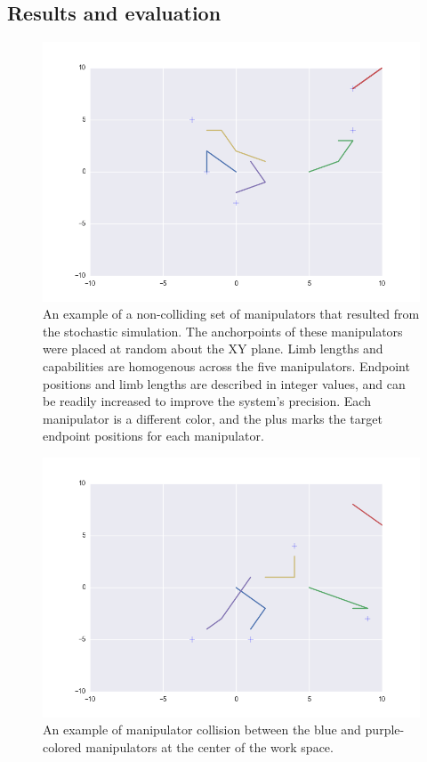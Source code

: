 \documentclass[9pt,twocolumn,twoside]{pnas-new}
\begin{document}
\subsection*{Results and evaluation}
\begin{figure}%
\centering
\includegraphics[width=1.0\linewidth]{file1480904553866_949}
\caption{An example of a non-colliding set of manipulators that resulted from the stochastic simulation. The anchorpoints of these manipulators were placed at random about the XY plane. Limb lengths and capabilities are homogenous across the five manipulators. Endpoint positions and limb lengths are described in integer values, and can be readily increased to improve the system's precision. Each manipulator is a different color, and the plus marks the target endpoint positions for each manipulator.}
\label{fig:trials}
\end{figure}


\begin{figure}%
\centering
\includegraphics[width=1.0\linewidth]{file1480904545447_182}
\caption{An example of manipulator collision between the blue and purple-colored manipulators at the center of the work space.}
\label{fig:nonintersection}
\end{figure}
\end{document}
